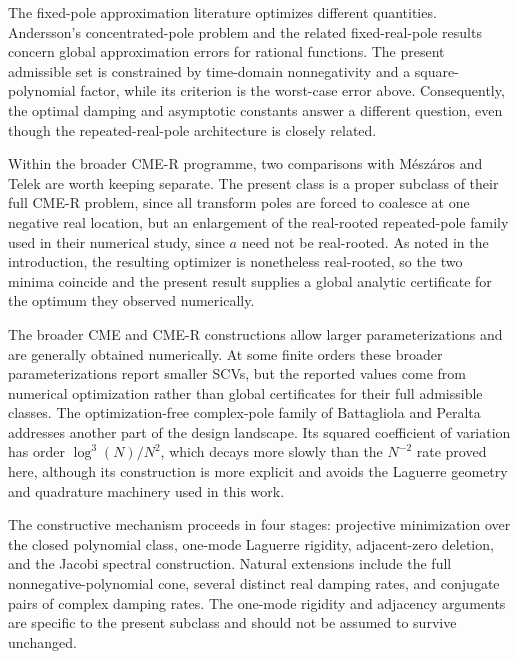\documentclass[11pt]{article}
\numberwithin{equation}{section}
\theoremstyle{definition}
\theoremstyle{remark}
\begin{document}
The fixed-pole approximation literature optimizes different quantities.
Andersson's concentrated-pole problem and the related fixed-real-pole results
\cite{andersson1981,anderssonganelius1977,borwein1983} concern global
approximation errors for rational functions. The present admissible set is constrained by time-domain
nonnegativity and a square-polynomial factor, while its criterion is the worst-case error above. Consequently, the optimal damping and asymptotic
constants answer a different question, even though the repeated-real-pole
architecture is closely related.

Within the broader CME-R programme, two comparisons with M\'esz\'aros and
Telek \cite{meszarostelek2022} are worth keeping separate. The present
class is a proper subclass of their full CME-R problem, since all
transform poles are forced to coalesce at one negative real location, but
an enlargement of the real-rooted repeated-pole family used in their
numerical study, since $a$ need not be real-rooted. As noted in the
introduction, the resulting optimizer is nonetheless real-rooted, so the
two minima coincide and the present result supplies a global analytic
certificate for the optimum they observed numerically.

The broader CME and CME-R constructions
\cite{horvathsafartelekzambo2016,horvathhorvathtelek2020,almousatelek2021,meszarostelek2022}
allow larger parameterizations and are generally obtained numerically. At
some finite orders these broader parameterizations report smaller SCVs, but
the reported values come from numerical optimization rather than global
certificates for their full admissible classes. The optimization-free
complex-pole family of Battagliola and Peralta
\cite{battagliolaperalta2026} addresses another part of the design landscape.
Its squared coefficient of variation has order $\log^3(N)/N^2$, which decays more slowly than the $N^{-2}$ rate proved here, although its construction is more
explicit and avoids the Laguerre geometry and quadrature machinery used in this work.

The constructive mechanism proceeds in four stages: projective minimization over the closed polynomial class, one-mode Laguerre rigidity, adjacent-zero deletion, and the Jacobi spectral construction. Natural extensions include the full nonnegative-polynomial cone, several distinct real damping rates, and conjugate pairs of complex damping rates. The one-mode rigidity and adjacency arguments are specific to the present subclass and
should not be assumed to survive unchanged.
\end{document}
